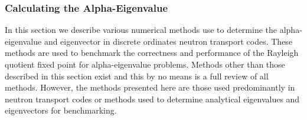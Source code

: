 \subsubsection{Calculating the Alpha-Eigenvalue}

In this section we describe various numerical methods use to determine the alpha-eigenvalue and eigenvector in discrete ordinates neutron transport codes. These methods are used to benchmark the correctness and performance of the Rayleigh quotient fixed point for alpha-eigenvalue problems. Methods other than those described in this section exist and this by no means is a full review of all methods. However, the methods presented here are those used predominantly in neutron transport codes or methods used to determine analytical eigenvalues and eigenvectors for benchmarking.

